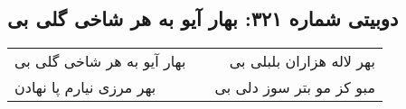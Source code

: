 \begin{center}
\section*{دوبیتی شماره ۳۲۱: بهار آیو به هر شاخی گلی بی}
\label{sec:321}
\begin{longtable}{l p{0.5cm} r}
بهار آیو به هر شاخی گلی بی
&&
بهر لاله هزاران بلبلی بی
\\
بهر مرزی نیارم پا نهادن
&&
مبو کز مو بتر سوز دلی بی
\\
\end{longtable}
\end{center}
